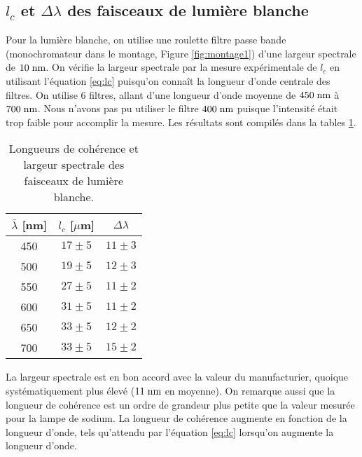 \documentclass[10pt,letterpaper,twocolumn]{article}
\newcommand{\s}{\hspace{0.1cm}}
\begin{document}
\subsection{$l_c$ et $\Delta \lambda$ des faisceaux de lumière blanche}
Pour la lumière blanche, on utilise une roulette filtre passe bande (monochromateur dans le montage, Figure \ref{fig:montage1}) d'une largeur spectrale de $10\s \text{nm}$. On vérifie la largeur spectrale par la mesure expérimentale de $l_c$ en utilisant l'équation \eqref{eq:lc} puisqu'on connaît la longueur d'onde centrale des filtres. On utilise $6$ filtres, allant d'une longueur d'onde moyenne de $450\s \text{nm}$ à $700\s \text{nm}$. Nous n'avons pas pu utiliser le filtre $400\s \text{nm}$ puisque l'intensité était trop faible pour accomplir la mesure. Les résultats sont compilés dans la tables \ref{tab:Blanche}. 
\begin{table}[H]
	\centering
	\caption{Longueurs de cohérence et largeur spectrale des faisceaux de lumière blanche.}
	\label{tab:Blanche}
	\begin{tabular}{|c|c|c|}
		\hline
		$\bar{\lambda}$ [nm] & $l_c$ [$\mu$m] & $\Delta \lambda$  \\\hline
		450 &   $17 \pm 5$ & $11 \pm 3$ \\\hline
		500 &   $19 \pm 5$ & $12 \pm 3$ \\\hline
		550  &  $27 \pm 5$  & $11 \pm 2$ \\\hline
		600  &  $31 \pm 5$  & $11 \pm 2$ \\\hline
		650  & 	$33 \pm 5$  & $12 \pm 2$ \\\hline
		700 & 	$33 \pm 5$  & $15 \pm 2$ \\\hline
	\end{tabular}
\end{table}
La largeur spectrale est en bon accord avec la valeur du manufacturier, quoique systématiquement plus élevé ($11\s \text{nm}$ en moyenne). On remarque aussi que la longueur de cohérence est un ordre de grandeur plus petite que la valeur mesurée pour la lampe de sodium. La longueur de cohérence augmente en fonction de la longueur d'onde, tels qu'attendu par l'équation \eqref{eq:lc} lorsqu'on augmente la longueur d'onde. 
\end{document}
